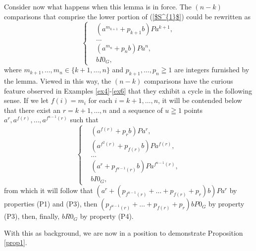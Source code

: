 \documentclass[pdflatex,sn-apa,11pt]{sn-jnl}%
\begin{document}
Consider now what happens when this lemma is in force. The $(n-k)$ comparisons that comprise the lower portion of (\ref{$S^{1}$}) could be rewritten as
\begin{equation*}
  \left\{
    \begin{aligned}
      & (a^{m_{k+1}} + p_{k+1}b)Pa^{k+1}, \\
      & \dots \\
      & (a^{m_{n}} + p_{n}b)Pa^{n}, \\
      & bI{0_G},
    \end{aligned}
  \right.
\end{equation*}
where $m_{k+1}, \dots, m_{n} \in \{k+1, \dots, n\}$ and $p_{k+1}, \dots, p_n \geqq 1$ are integers furnished by the lemma. Viewed in this way, the $(n-k)$ comparisons have the curious feature observed in Examples \ref{ex4}-\ref{ex6} that they exhibit a cycle in the following sense. If we let $f(i) = m_{i}$ for each $i = k+1, \dots, n$, it will be contended below that there exist an $r = k+1, \dots, n$ and a sequence of $u \geqq 1$ points $a^{r}, a^{f(r)}, \dots, a^{f^{u-1}(r)}$ such that 
\begin{equation*}
  \left\{
    \begin{aligned}
      & (a^{f(r)} + p_{r}b)Pa^{r}, \\
      & (a^{f^2(r)} + p_{f(r)}b)Pa^{f(r)}, \\
      & \dots \\
      & (a^{r} + p_{f^{u-1}(r)}b)Pa^{f^{u-1}(r)}, \\
      & bI{0_G},
    \end{aligned}
  \right.
\end{equation*}
from which it will follow that $(a^{r} + (p_{f^{u-1}(r)} + \dots + p_{f(r)} + p_{r})b)Pa^{r}$ by properties (P1) and (P3), then $(p_{f^{u-1}(r)} + \dots + p_{f(r)} + p_{r})bP0_G$ by property (P3), then, finally, $bR0_G$ by property (P4). 

With this as background, we are now in a position to demonstrate Proposition \ref{prop1}.
\end{document}
